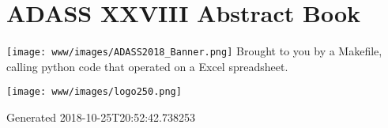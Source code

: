 \documentclass{report}
\begin{document}
              \chapter*{ADASS XXVIII Abstract Book}              
              \texttt{[image: www/images/ADASS2018\_Banner.png]}
              Brought to you by a Makefile, calling python code that operated on a Excel spreadsheet.
              \newline\newline
              \bigskip\bigskip
              \begin{center}
              \texttt{[image: www/images/logo250.png]}
              \end{center}
              \bigskip
           Generated 2018-10-25T20:52:42.738253\newpage
\end{document}
